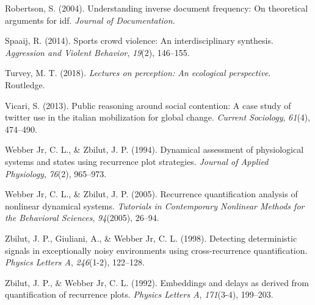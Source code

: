 \documentclass[english,man]{apa6}
\begin{document}
\leavevmode\hypertarget{ref-robertson2004understanding}{}%
Robertson, S. (2004). Understanding inverse document frequency: On theoretical arguments for idf. \emph{Journal of Documentation}.

\leavevmode\hypertarget{ref-spaaij2014sports}{}%
Spaaij, R. (2014). Sports crowd violence: An interdisciplinary synthesis. \emph{Aggression and Violent Behavior}, \emph{19}(2), 146--155.

\leavevmode\hypertarget{ref-turvey2018lectures}{}%
Turvey, M. T. (2018). \emph{Lectures on perception: An ecological perspective}. Routledge.

\leavevmode\hypertarget{ref-vicari2013public}{}%
Vicari, S. (2013). Public reasoning around social contention: A case study of twitter use in the italian mobilization for global change. \emph{Current Sociology}, \emph{61}(4), 474--490.

\leavevmode\hypertarget{ref-webber1994dynamical}{}%
Webber Jr, C. L., \& Zbilut, J. P. (1994). Dynamical assessment of physiological systems and states using recurrence plot strategies. \emph{Journal of Applied Physiology}, \emph{76}(2), 965--973.

\leavevmode\hypertarget{ref-webber2005recurrence}{}%
Webber Jr, C. L., \& Zbilut, J. P. (2005). Recurrence quantification analysis of nonlinear dynamical systems. \emph{Tutorials in Contemporary Nonlinear Methods for the Behavioral Sciences}, \emph{94}(2005), 26--94.

\leavevmode\hypertarget{ref-zbilut1998detecting}{}%
Zbilut, J. P., Giuliani, A., \& Webber Jr, C. L. (1998). Detecting deterministic signals in exceptionally noisy environments using cross-recurrence quantification. \emph{Physics Letters A}, \emph{246}(1-2), 122--128.

\leavevmode\hypertarget{ref-zbilut1992embeddings}{}%
Zbilut, J. P., \& Webber Jr, C. L. (1992). Embeddings and delays as derived from quantification of recurrence plots. \emph{Physics Letters A}, \emph{171}(3-4), 199--203.

\endgroup
\end{document}
